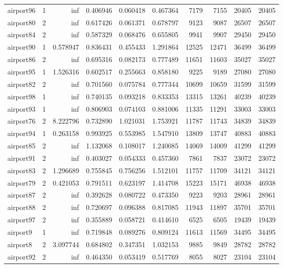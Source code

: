 \begin{longtable}{|l|r|r|r|r|r|r|r|r|r|}
airport96 & 1 & inf & 0.406946 & 0.060418 & 0.467364 & 7179 & 7155 & 20405 & 20405 \\
airport80 & 2 & inf & 0.617426 & 0.061371 & 0.678797 & 9123 & 9087 & 26507 & 26507 \\
airport84 & 2 & inf & 0.587329 & 0.068476 & 0.655805 & 9941 & 9907 & 29450 & 29450 \\
airport90 & 1 & 0.578947 & 0.836431 & 0.455433 & 1.291864 & 12525 & 12471 & 36499 & 36499 \\
airport86 & 2 & inf & 0.695316 & 0.082173 & 0.777489 & 11651 & 11603 & 35027 & 35027 \\
airport95 & 1 & 1.526316 & 0.602517 & 0.255663 & 0.858180 & 9225 & 9189 & 27080 & 27080 \\
airport82 & 2 & inf & 0.701560 & 0.075784 & 0.777344 & 10699 & 10659 & 31599 & 31599 \\
airport98 & 1 & inf & 0.740135 & 0.093218 & 0.833353 & 13315 & 13261 & 40239 & 40239 \\
airport93 & 1 & inf & 0.806903 & 0.074103 & 0.881006 & 11335 & 11291 & 33003 & 33003 \\
airport76 & 2 & 8.222796 & 0.732890 & 1.021031 & 1.753921 & 11787 & 11743 & 34839 & 34839 \\
airport94 & 1 & 0.263158 & 0.993925 & 0.553985 & 1.547910 & 13809 & 13747 & 40883 & 40883 \\
airport85 & 2 & inf & 1.132068 & 0.108017 & 1.240085 & 14069 & 14009 & 41299 & 41299 \\
airport91 & 2 & inf & 0.403027 & 0.054333 & 0.457360 & 7861 & 7837 & 23072 & 23072 \\
airport83 & 2 & 1.296689 & 0.755845 & 0.756256 & 1.512101 & 11757 & 11709 & 34121 & 34121 \\
airport79 & 2 & 0.421053 & 0.791511 & 0.623197 & 1.414708 & 15223 & 15171 & 46938 & 46938 \\
airport87 & 2 & inf & 0.392628 & 0.080722 & 0.473350 & 9223 & 9203 & 28961 & 28961 \\
airport88 & 2 & inf & 0.720697 & 0.096388 & 0.817085 & 11943 & 11897 & 35701 & 35701 \\
airport97 & 2 & inf & 0.355889 & 0.058721 & 0.414610 & 6525 & 6505 & 19439 & 19439 \\
airport9 & 1 & inf & 0.719848 & 0.089276 & 0.809124 & 11613 & 11569 & 34495 & 34495 \\
airport8 & 2 & 3.097744 & 0.684802 & 0.347351 & 1.032153 & 9885 & 9849 & 28782 & 28782 \\
airport92 & 2 & inf & 0.464350 & 0.053419 & 0.517769 & 8055 & 8027 & 23104 & 23104 \\

\end{longtable}
